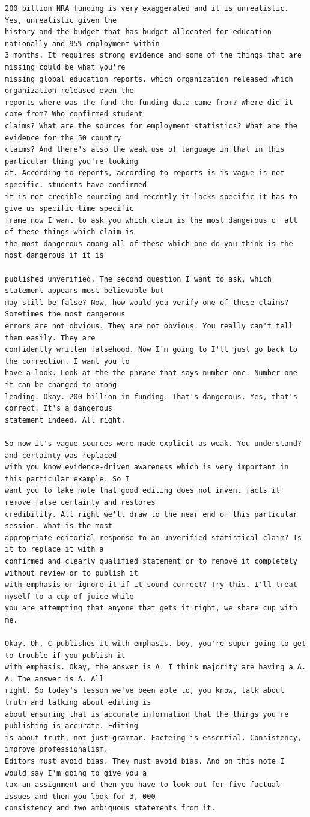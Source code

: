 {\begin{Verbatim}
200 billion NRA funding is very exaggerated and it is unrealistic. Yes, unrealistic given the
history and the budget that has budget allocated for education nationally and 95% employment within
3 months. It requires strong evidence and some of the things that are missing could be what you're
missing global education reports. which organization released which organization released even the
reports where was the fund the funding data came from? Where did it come from? Who confirmed student
claims? What are the sources for employment statistics? What are the evidence for the 50 country
claims? And there's also the weak use of language in that in this particular thing you're looking
at. According to reports, according to reports is is vague is not specific. students have confirmed
it is not credible sourcing and recently it lacks specific it has to give us specific time specific
frame now I want to ask you which claim is the most dangerous of all of these things which claim is
the most dangerous among all of these which one do you think is the most dangerous if it is

published unverified. The second question I want to ask, which statement appears most believable but
may still be false? Now, how would you verify one of these claims? Sometimes the most dangerous
errors are not obvious. They are not obvious. You really can't tell them easily. They are
confidently written falsehood. Now I'm going to I'll just go back to the correction. I want you to
have a look. Look at the the phrase that says number one. Number one it can be changed to among
leading. Okay. 200 billion in funding. That's dangerous. Yes, that's correct. It's a dangerous
statement indeed. All right.

So now it's vague sources were made explicit as weak. You understand? and certainty was replaced
with you know evidence-driven awareness which is very important in this particular example. So I
want you to take note that good editing does not invent facts it remove false certainty and restores
credibility. All right we'll draw to the near end of this particular session. What is the most
appropriate editorial response to an unverified statistical claim? Is it to replace it with a
confirmed and clearly qualified statement or to remove it completely without review or to publish it
with emphasis or ignore it if it sound correct? Try this. I'll treat myself to a cup of juice while
you are attempting that anyone that gets it right, we share cup with me.

Okay. Oh, C publishes it with emphasis. boy, you're super going to get to trouble if you publish it
with emphasis. Okay, the answer is A. I think majority are having a A. A. The answer is A. All
right. So today's lesson we've been able to, you know, talk about truth and talking about editing is
about ensuring that is accurate information that the things you're publishing is accurate. Editing
is about truth, not just grammar. Facteing is essential. Consistency, improve professionalism.
Editors must avoid bias. They must avoid bias. And on this note I would say I'm going to give you a
tax an assignment and then you have to look out for five factual issues and then you look for 3, 000
consistency and two ambiguous statements from it.


\end{Verbatim}}
